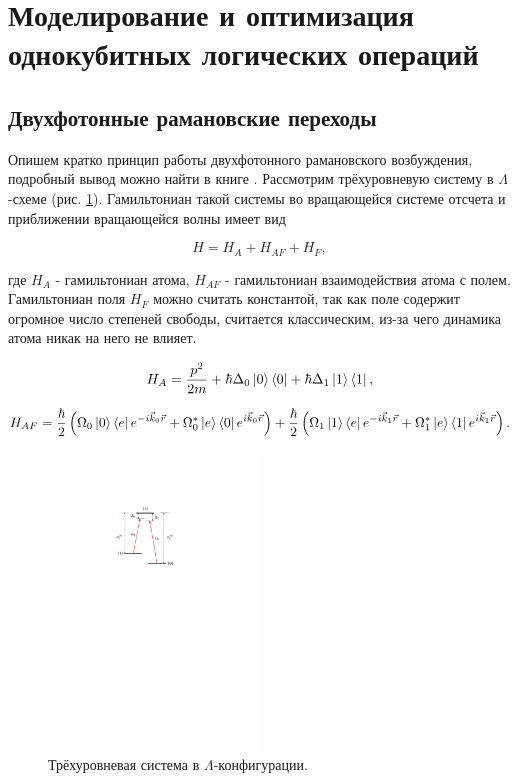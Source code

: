 \section{Моделирование и оптимизация однокубитных логических операций}
\label{sec:chapter_3}

\subsection{Двухфотонные рамановские переходы}

Опишем кратко принцип работы двухфотонного рамановского возбуждения, подробный вывод можно найти в книге \cite{Steck}. Рассмотрим трёхуровневую систему в $\Lambda$-схеме (рис. \ref{fig:raman_scheme}). Гамильтониан такой системы во вращающейся системе отсчета и приближении вращающейся волны имеет вид

\begin{equation}
	H = H_{A} + H_{AF} + H_{F},
\end{equation}

где $H_{A}$ - гамильтониан атома, $H_{AF}$ - гамильтониан взаимодействия атома с полем. Гамильтониан поля $H_{F}$ можно считать константой, так как поле содержит огромное число степеней свободы, считается классическим, из-за чего динамика атома никак на него не влияет. 

\begin{equation}
	H_{A} = \frac{p^2}{2m} + \hbar \Delta_0 \left| 0 \right\rangle\left\langle 0 \right| + \hbar \Delta_{1}\left| 1 \right\rangle\left\langle 1 \right|,
\end{equation}

\begin{equation}
	H_{AF} = \frac{\hbar}{2}\left(\Omega_0\left| 0 \right\rangle\left\langle e \right|e^{-i\vec{k}_0\vec{r}}+\Omega_0^*\left| e \right\rangle\left\langle 0 \right|e^{i\vec{k}_0\vec{r}}\right) + \frac{\hbar }{2}\left(\Omega_1\left| 1 \right\rangle\left\langle e \right|e^{-i\vec{k}_1\vec{r}}+\Omega_1^*\left| e \right\rangle\left\langle 1 \right|e^{i\vec{k}_1\vec{r}} \right).
\end{equation}

\begin{figure}[ht]
	\centering
	\includegraphics[width=0.5\textwidth]{images/raman_scheme.pdf}
	\caption{Трёхуровневая система в $\Lambda$-конфигурации.}
	\label{fig:raman_scheme}
\end{figure}

